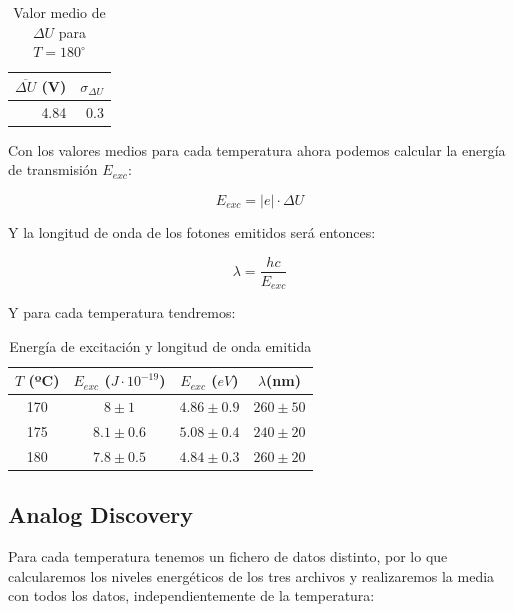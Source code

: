 \documentclass[11pt, a4paper, twocolumn]{article}
\begin{document}
\begin{table}[h]
\centering   

\begin{tabular}{rr}

   $\overline{\Delta U}$ (V)&   $\sigma_{\Delta U}$ \\
\hline
              4.84 &                 0.3 \\
\hline
\end{tabular}
\label{tab: Tabla180}
\caption{Valor medio de $\Delta U$ para $T = 180^\circ$}
\end{table}

Con los valores medios para cada temperatura ahora podemos calcular 
la energía de transmisión $E_{exc}$:

\begin{equation}
   E_{exc} = |e| \cdot \Delta U
\end{equation}

Y la longitud de onda de los fotones emitidos será entonces: 

\begin{equation}
   \lambda = \frac{hc}{E_{exc}}
\end{equation}

Y para cada temperatura tendremos:

\begin{table}[H]
\centering   

\begin{tabular}{cccc}

   $T$ (ºC)&   $E_{exc}$ ($J\cdot 10^{-19}$) & $E_{exc}$ ($eV$) & $\lambda$(nm)\\
\hline
            170 &       $8 \pm 1 $     & $4.86\pm0.9$&$260\pm50$\\
            175 &       $8.1 \pm 0.6$ & $5.08\pm0.4$&$240\pm20$\\
            180 &       $7.8 \pm 0.5$ & $4.84\pm0.3$&$260\pm20$\\                          
\hline
\end{tabular}
\label{tab: TabPicoFin}
\caption{Energía de excitación y longitud de onda emitida}
\end{table}

\subsection{Analog Discovery}

Para cada temperatura tenemos un fichero de datos distinto, por lo que calcularemos 
los niveles energéticos de los tres archivos y realizaremos la media con todos los 
datos, independientemente de la temperatura:
\end{document}
